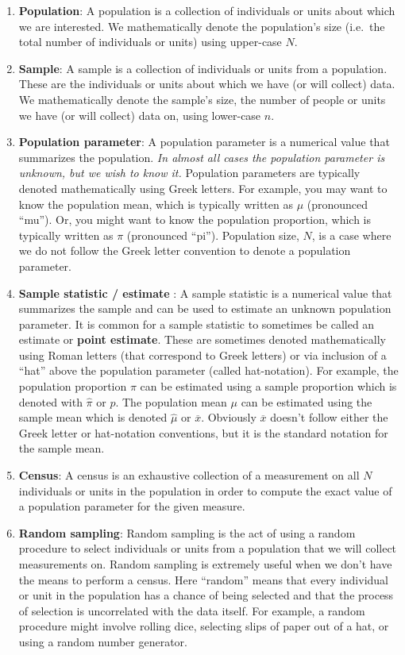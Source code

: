 \documentclass[
  letterpaper,
  DIV=11,
  numbers=noendperiod]{scrreprt}
\theoremstyle{definition}
\theoremstyle{remark}
\begin{document}
\begin{enumerate}
\def\labelenumi{\arabic{enumi}.}
\item
  \textbf{Population}: A population is a collection of individuals or
  units about which we are interested. We mathematically denote the
  population's size (i.e.~the total number of individuals or units)
  using upper-case \(N\).
\item
  \textbf{Sample}: A sample is a collection of individuals or units from
  a population. These are the individuals or units about which we have
  (or will collect) data. We mathematically denote the sample's size,
  the number of people or units we have (or will collect) data on, using
  lower-case \(n\).
\item
  \textbf{Population parameter}: A population parameter is a numerical
  value that summarizes the population. \emph{In almost all cases the
  population parameter is unknown, but we wish to know it.} Population
  parameters are typically denoted mathematically using Greek letters.
  For example, you may want to know the population mean, which is
  typically written as \(\mu\) (pronounced ``mu''). Or, you might want
  to know the population proportion, which is typically written as
  \(\pi\) (pronounced ``pi''). Population size, \(N\), is a case where
  we do not follow the Greek letter convention to denote a population
  parameter.
\item
  \textbf{Sample statistic / estimate }: A sample statistic is a
  numerical value that summarizes the sample and can be used to estimate
  an unknown population parameter. It is common for a sample statistic
  to sometimes be called an estimate or \textbf{point estimate}. These
  are sometimes denoted mathematically using Roman letters (that
  correspond to Greek letters) or via inclusion of a ``hat'' above the
  population parameter (called hat-notation). For example, the
  population proportion \(\pi\) can be estimated using a sample
  proportion which is denoted with \(\hat{\pi}\) or \(p\). The
  population mean \(\mu\) can be estimated using the sample mean which
  is denoted \(\hat{\mu}\) or \(\overline{x}\). Obviously
  \(\overline{x}\) doesn't follow either the Greek letter or
  hat-notation conventions, but it is the standard notation for the
  sample mean.
\item
  \textbf{Census}: A census is an exhaustive collection of a measurement
  on all \(N\) individuals or units in the population in order to
  compute the exact value of a population parameter for the given
  measure.
\item
  \textbf{Random sampling}: Random sampling is the act of using a random
  procedure to select individuals or units from a population that we
  will collect measurements on. Random sampling is extremely useful when
  we don't have the means to perform a census. Here ``random'' means
  that every individual or unit in the population has a chance of being
  selected and that the process of selection is uncorrelated with the
  data itself. For example, a random procedure might involve rolling
  dice, selecting slips of paper out of a hat, or using a random number
  generator.
\end{enumerate}
\end{document}
